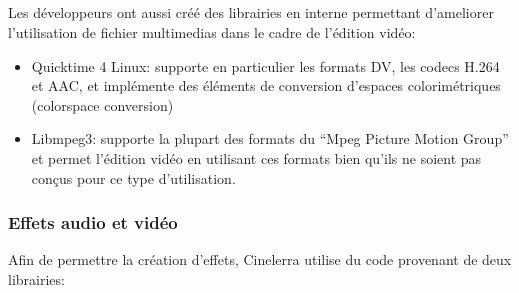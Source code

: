 \subparagraph{}

Les développeurs ont aussi créé des librairies en interne permettant
d'ameliorer l'utilisation de fichier multimedias dans le cadre de
l'édition vidéo:

\begin{itemize}

  \item {Quicktime 4 Linux: supporte en particulier les formats DV,
    les codecs H.264 et AAC, et implémente des éléments de conversion
    d'espaces colorimétriques (colorspace conversion)}

  \item {Libmpeg3: supporte la plupart des formats du ``Mpeg Picture
    Motion Group''  et permet l'édition
    vidéo en utilisant ces formats bien qu'ils ne soient pas conçus
    pour ce type d'utilisation.}

\end{itemize}

\subsubsection {Effets audio et vidéo}

Afin de permettre la création d'effets, Cinelerra utilise du  code
provenant de deux librairies:

